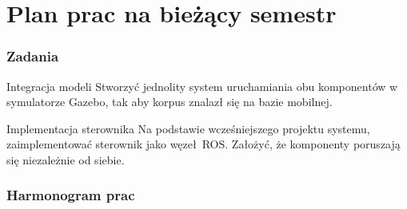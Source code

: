 \section{Plan prac na bieżący semestr}

\begin{frame}
	\frametitle{Zadania}
	\begin{block}{Integracja modeli}
	Stworzyć jednolity system uruchamiania obu komponentów w symulatorze
	Gazebo, tak aby korpus znalazł się na bazie mobilnej.
	\end{block}
	\medskip
	\begin{block}{Implementacja sterownika}
	Na podstawie wcześniejszego projektu systemu, zaimplementować 
	sterownik jako węzeł ROS. Założyć, że komponenty poruszają się 
	niezależnie od siebie.
	\end{block}
\end{frame}



\begin{frame}
	\frametitle{Harmonogram prac}
	\centering
	\begin{ganttchart}{1}{18}
		 \ganttnewline
		 \ganttnewline
		 \ganttnewline
		 \ganttnewline
		   \ganttnewline
		  
		\end{ganttchart}
\end{frame}

